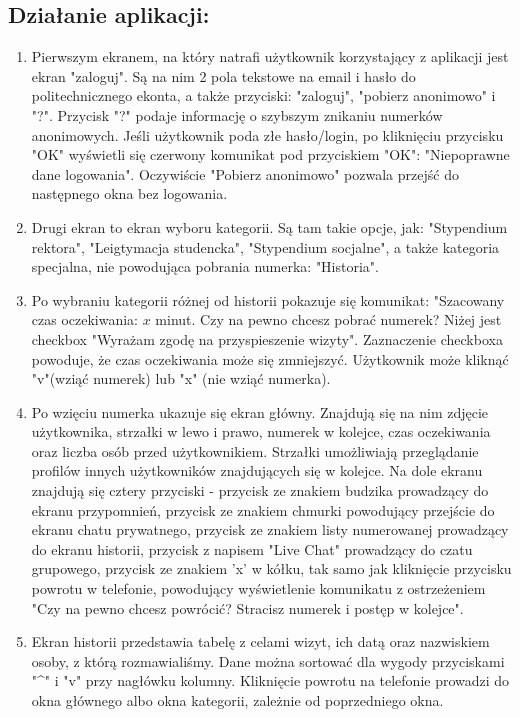 \documentclass[12pt]{article}
\begin{document}
\subsection{Działanie aplikacji:}
\begin {enumerate}
	\item Pierwszym ekranem, na który natrafi użytkownik korzystający z aplikacji jest ekran "zaloguj". Są na nim 2 pola tekstowe na email i hasło do politechnicznego ekonta, a także przyciski: "zaloguj", "pobierz anonimowo" i "?". Przycisk "?" podaje informację o szybszym znikaniu numerków anonimowych. Jeśli użytkownik poda złe hasło/login, po kliknięciu przycisku "OK" wyświetli się czerwony komunikat pod przyciskiem "OK": "Niepoprawne dane logowania". Oczywiście "Pobierz anonimowo" pozwala przejść do następnego okna bez logowania.
	
	\item Drugi ekran to ekran wyboru kategorii. Są tam takie opcje, jak: "Stypendium rektora", "Leigtymacja studencka", "Stypendium socjalne", a także kategoria specjalna, nie powodująca pobrania numerka: "Historia".
	
	\item Po wybraniu kategorii różnej od historii pokazuje się komunikat: "Szacowany czas oczekiwania: ${x}$ minut. Czy na pewno chcesz pobrać numerek? Niżej jest checkbox "Wyrażam zgodę na przyspieszenie wizyty". Zaznaczenie checkboxa powoduje, że czas oczekiwania może się zmniejszyć. Użytkownik może kliknąć "v"(wziąć numerek) lub "x" (nie wziąć numerka).
	
	\item Po wzięciu numerka ukazuje się ekran główny. Znajdują się na nim zdjęcie użytkownika, strzałki w lewo i prawo, numerek w kolejce, czas oczekiwania oraz liczba osób przed użytkownikiem. Strzałki umożliwiają przeglądanie profilów innych użytkowników znajdujących się w kolejce. Na dole ekranu znajdują się cztery przyciski - przycisk ze znakiem budzika prowadzący do ekranu przypomnień, przycisk ze znakiem chmurki powodujący przejście do ekranu chatu prywatnego, przycisk ze znakiem listy numerowanej prowadzący do ekranu historii, przycisk z napisem "Live Chat" prowadzący do czatu grupowego, przycisk ze znakiem 'x' w kółku, tak samo jak kliknięcie przycisku powrotu w telefonie, powodujący wyświetlenie komunikatu z ostrzeżeniem "Czy na pewno chcesz powrócić? Stracisz numerek i postęp w kolejce".
	
	\item Ekran historii przedstawia tabelę z celami wizyt, ich datą oraz nazwiskiem osoby, z którą rozmawialiśmy. Dane można sortować dla wygody przyciskami "\^{}" i "v" przy nagłówku kolumny. Kliknięcie powrotu na telefonie prowadzi do okna głównego albo okna kategorii, zależnie od poprzedniego okna.
	

\end{enumerate}
\end{document}
